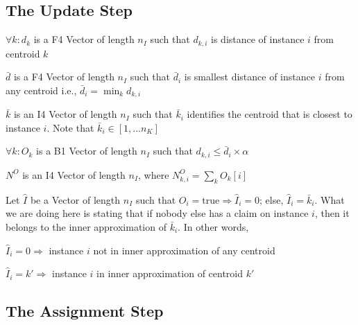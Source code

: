 \subsection{The Update Step}
\label{update}

\be
\item \(\forall k: d_k \) is a F4 Vector of length \(n_I\) such that \(d_{k, i}\)
is distance of instance \(i\) from centroid \(k\)
\item \(\bar{d}\) is a F4 Vector of length \(n_I\) such that \(\bar{d}_i\) is
smallest distance of instance \(i\) from any centroid i.e.,
\(\bar{d}_i = \min_k d_{k, i}\)
\item \(\bar{k}\) is an I4 Vector of length \(n_I\) such that \(\bar{k}_i\) identifies
the centroid that is closest to instance \(i\). Note that 
\(\bar{k}_i \in [1, \ldots n_K]\)
\item \(\forall k: O_k\) is a B1 Vector of length \(n_I\) such that 
\(d_{k, i} \leq \bar{d}_i \times \alpha\)
\item \(N^O\) is an I4 Vector of length \(n_I\), 
where \(N^O_{k, i}  = \sum_k O_k[i]\)
\item Let \(\hat{I}\) be a Vector of length \(n_I\) such that 
\(O_i = \mathrm{true} \Rightarrow \hat{I}_i = 0\); else, \(\hat{I}_i = \bar{k}_i\). What
we are doing here is stating that if nobody else has a claim on instance \(i\), then
it belongs to the inner approximation of \(\bar{k}_i\). In other words,
\be
\item \(\hat{I}_i = 0 \Rightarrow \) instance \(i\) not in inner approximation
of any centroid
\item \(\hat{I}_i = k' \Rightarrow \) instance \(i\) in inner approximation
of centroid \(k'\)
\ee
\ee

\subsection{The Assignment Step}
\label{assignment}





